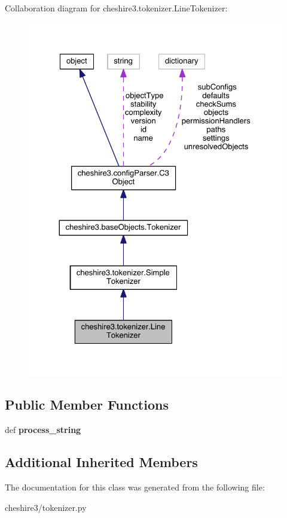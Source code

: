 Collaboration diagram for cheshire3.\-tokenizer.\-Line\-Tokenizer\-:
\nopagebreak
\begin{figure}[H]
\begin{center}
\leavevmode
\includegraphics[width=326pt]{classcheshire3_1_1tokenizer_1_1_line_tokenizer__coll__graph}
\end{center}
\end{figure}
\subsection*{Public Member Functions}
\begin{DoxyCompactItemize}
\item 
\hypertarget{classcheshire3_1_1tokenizer_1_1_line_tokenizer_a12f44919bcab020f63bb4abfd6ae9eab}{def {\bfseries process\-\_\-string}}\label{classcheshire3_1_1tokenizer_1_1_line_tokenizer_a12f44919bcab020f63bb4abfd6ae9eab}

\end{DoxyCompactItemize}
\subsection*{Additional Inherited Members}


The documentation for this class was generated from the following file\-:\begin{DoxyCompactItemize}
\item 
cheshire3/tokenizer.\-py\end{DoxyCompactItemize}
